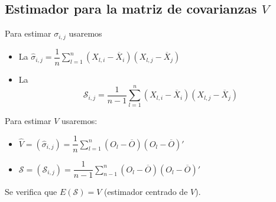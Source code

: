\subsection{Estimador para la matriz de covarianzas $V$}

Para estimar $\sigma_{i,j}$ usaremos
\begin{itemize}[label=$\to$]
\item La  $\hat{\sigma}_{i,j}=\dfrac{1}{n}\sum_{l=1}^{n}(X_{l,i}-\overline{X}_i)(X_{l,j}-\overline{X}_j)$
\item La  \[ \mathcal{S}_{i,j}=\dfrac{1}{n-1}\sum_{l=1}^{n}(X_{l,i}-\overline{X}_i)(X_{l,j}-\overline{X}_j) \]
\end{itemize}
Para estimar $V$ usaremos:
\begin{itemize}[label=$\to$]
\item $\hat{V}=(\hat{\sigma}_{i,j})=\dfrac{1}{n}\sum_{l=1}^{n}(O_l-\overline{O})(O_l-\overline{O})'$
\item $\mathcal{S}=(\mathcal{S}_{i,j})=\dfrac{1}{n-1}\sum_{n-1}^{n}(O_l-\overline{O})(O_l-\overline{O})'$
\end{itemize}
Se verifica que $E(\mathcal{S})=V$ (estimador centrado de $V$).

